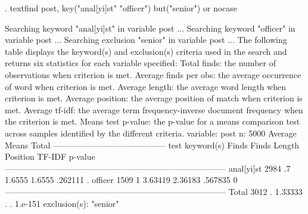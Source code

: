 {\smallskip}
. textfind post, key("anal[yi]st" "officer") but("senior") or nocase
 
Searching keyword "anal[yi]st" in variable post ...
Searching keyword "officer" in variable post ...
Searching exclusion "senior" in variable post ...
{\smallskip}
{\smallskip}
The following table displays the keyword(s) and exclusion(s) criteria used in
the search and returns six statistics for each variable specified:
{\smallskip}
Total finds:           the number of observations when criterion is met.
Average finds per obs: the average occurrence of word when criterion is met.
Average length:        the average word length when criterion is met.
Average position:      the average position of match when criterion is met.
Average tf-idf:        the average term frequency-inverse document frequency
                       when the criterion is met.
Means test p-value:    the p-value for a means comparison test across samples
                       identified by the different criteria.
{\smallskip}
                               {}                               
variable:   post
n: 5000                                      Average                       Means
                    Total   -----------------------------------------       test
keyword(s)          Finds      Finds     Length   Position     TF-IDF    p-value
--------------------------------------------------------------------------------
anal[yi]st           2984         .7     1.6555     1.6555    .262111          .
officer              1509          1    3.63419    2.36183    .567835          0
--------------------------------------------------------------------------------
Total                3012          .    1.33333          .          .    1.e-151
exclusion(s):
"senior"
